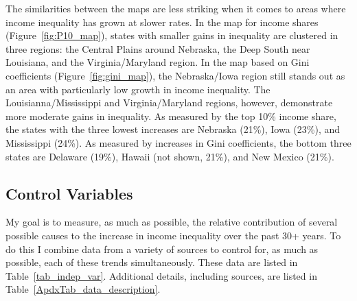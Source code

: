 \documentclass[11pt]{article}
\theoremstyle{definition}
\numberwithin{equation}{section}
\begin{document}
The similarities between the maps are less striking when it comes to areas where income inequality has grown at slower rates. In the map for income shares (Figure~\ref{fig:P10_map}), states with smaller gains in inequality are clustered in three regions: the Central Plains around Nebraska, the Deep South near Louisiana, and the Virginia/Maryland region. In the map based on Gini coefficients (Figure~\ref{fig:gini_map}), the Nebraska/Iowa region still stands out as an area with particularly low growth in income inequality. The Louisianna/Mississippi and Virginia/Maryland regions, however, demonstrate more moderate gains in inequality. As measured by the top 10\% income share, the states with the three lowest increases are Nebraska (21\%), Iowa (23\%), and Mississippi (24\%). As measured by increases in Gini coefficients, the bottom three states are Delaware (19\%), Hawaii (not shown, 21\%), and New Mexico (21\%). 


\subsection{Control Variables}
My goal is to measure, as much as possible, the relative contribution of several possible causes to the increase in income inequality over the past 30+ years. To do this I combine data from a variety of sources to control for, as much as possible, each of these trends simultaneously. These data are listed in Table~\ref{tab_indep_var}. Additional details, including sources, are listed in Table~\ref{ApdxTab_data_description}.
\end{document}
